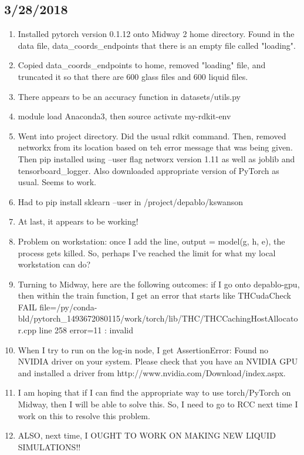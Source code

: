 \documentclass[12pt,reqno]{amsart}
\numberwithin{equation}{section}
\begin{document}
\subsection{3/28/2018}

\begin{enumerate}
\item Installed pytorch version 0.1.12 onto Midway 2 home directory.  Found in the data file, data\_coords\_endpoints that there is an empty file called "loading".  
\item Copied data\_coords\_endpoints to home, removed "loading" file, and truncated it so that there are 600 glass files and 600 liquid files.  
\item There appears to be an accuracy function in datasets/utils.py 
\item module load Anaconda3, then source activate my-rdkit-env
\item Went into project directory.  Did the usual rdkit command.  Then, removed networkx from its location based on teh error message that was being given.  Then pip installed using --user flag networx version 1.11 as well as joblib and tensorboard\_logger.  Also downloaded appropriate version of PyTorch as usual.  Seems to work.  
\item Had to pip install sklearn --user in /project/depablo/kswanson
\item At last, it appears to be working!
\item Problem on workstation: once I add the line, output = model(g, h, e), the process gets killed.  So, perhaps I've reached the limit for what my local workstation can do?
\item Turning to Midway, here are the following outcomes: if I go onto depablo-gpu, then within the train function, I get an error that starts like THCudaCheck FAIL file=/py/conda-bld/pytorch\_1493672080115/work/torch/lib/THC/THCCachingHostAllocator.cpp line 258 error=11 : invalid 
\item When I try to run on the log-in node, I get AssertionError: Found no NVIDIA driver on your system.  Please check that you have an NVIDIA GPU and installed a driver from http://www.nvidia.com/Download/index.aspx. 
\item I am hoping that if I can find the appropriate way to use torch/PyTorch on Midway, then I will be able to solve this.  So, I need to go to RCC next time I work on this to resolve this problem.  
\item ALSO, next time, I OUGHT TO WORK ON MAKING NEW LIQUID SIMULATIONS!!
\end{enumerate}
\end{document}
